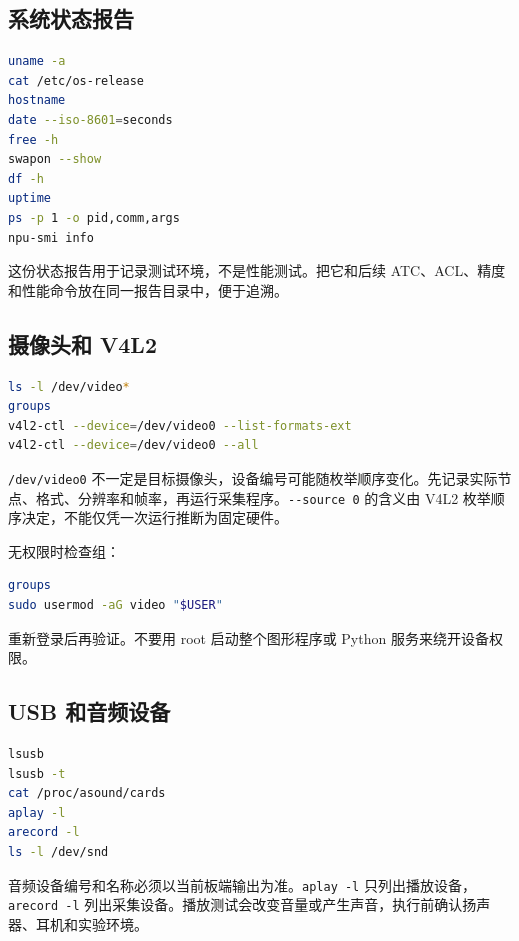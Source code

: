 \subsection{系统状态报告}\label{ux7cfbux7edfux72b6ux6001ux62a5ux544a}

\begin{lstlisting}[language=bash]
uname -a
cat /etc/os-release
hostname
date --iso-8601=seconds
free -h
swapon --show
df -h
uptime
ps -p 1 -o pid,comm,args
npu-smi info
\end{lstlisting}

这份状态报告用于记录测试环境，不是性能测试。把它和后续
ATC、ACL、精度和性能命令放在同一报告目录中，便于追溯。

\subsection{摄像头和 V4L2}\label{ux6444ux50cfux5934ux548c-v4l2}

\begin{lstlisting}[language=bash]
ls -l /dev/video*
groups
v4l2-ctl --device=/dev/video0 --list-formats-ext
v4l2-ctl --device=/dev/video0 --all
\end{lstlisting}

\passthrough{\lstinline!/dev/video0!}
不一定是目标摄像头，设备编号可能随枚举顺序变化。先记录实际节点、格式、分辨率和帧率，再运行采集程序。\passthrough{\lstinline!--source 0!}
的含义由 V4L2 枚举顺序决定，不能仅凭一次运行推断为固定硬件。

无权限时检查组：

\begin{lstlisting}[language=bash]
groups
sudo usermod -aG video "$USER"
\end{lstlisting}

重新登录后再验证。不要用 root 启动整个图形程序或 Python
服务来绕开设备权限。

\subsection{USB 和音频设备}\label{usb-ux548cux97f3ux9891ux8bbeux5907}

\begin{lstlisting}[language=bash]
lsusb
lsusb -t
cat /proc/asound/cards
aplay -l
arecord -l
ls -l /dev/snd
\end{lstlisting}

音频设备编号和名称必须以当前板端输出为准。\passthrough{\lstinline!aplay -l!}
只列出播放设备，\passthrough{\lstinline!arecord -l!}
列出采集设备。播放测试会改变音量或产生声音，执行前确认扬声器、耳机和实验环境。

